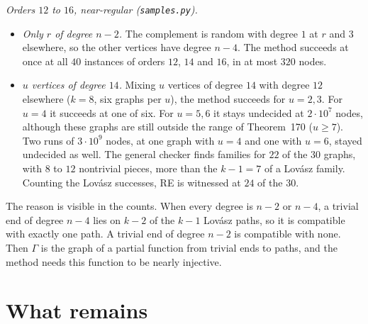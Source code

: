 \documentclass[11pt]{amsart}
\theoremstyle{definition}
\begin{document}
\emph{Orders $12$ to $16$, near-regular (\texttt{samples.py}).}
\begin{itemize}[leftmargin=*]
\item \emph{Only $r$ of degree $n-2$.} The complement is random with degree $1$ at $r$ and $3$
elsewhere, so the other vertices have degree $n-4$. The method succeeds at once at all $40$ instances
of orders $12$, $14$ and $16$, in at most $320$ nodes.
\item \emph{$u$ vertices of degree $14$.} Mixing $u$ vertices of degree $14$ with degree $12$ elsewhere
($k=8$, six graphs per $u$), the method succeeds for $u=2,3$. For $u=4$ it succeeds at one of six. For
$u=5,6$ it stays undecided at $2\cdot10^7$ nodes, although these graphs are still outside the range
of Theorem~170 ($u\ge7$). Two runs of $3\cdot10^9$ nodes, at one graph with $u=4$ and one with $u=6$,
stayed undecided as well. The general checker finds families for $22$ of the $30$ graphs, with $8$ to
$12$ nontrivial pieces, more than the $k-1=7$ of a Lov\'asz family. Counting the Lov\'asz successes,
RE is witnessed at $24$ of the $30$.
\end{itemize}
The reason is visible in the counts. When every degree is $n-2$ or $n-4$, a trivial end of degree
$n-4$ lies on $k-2$ of the $k-1$ Lov\'asz paths, so it is compatible with exactly one path. A trivial
end of degree $n-2$ is compatible with none. Then $\Gamma$ is the graph of a partial function from
trivial ends to paths, and the method needs this function to be nearly injective.

\section{What remains}\label{sec:open}
\end{document}

